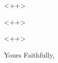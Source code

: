 \documentclass[11pt, letterpaper]{letter}
\begin{document}
\begin{letter}{<++>}
\opening{<++>}

<++>

\closing{Yours Faithfully,}

\end{letter}
\end{document}
